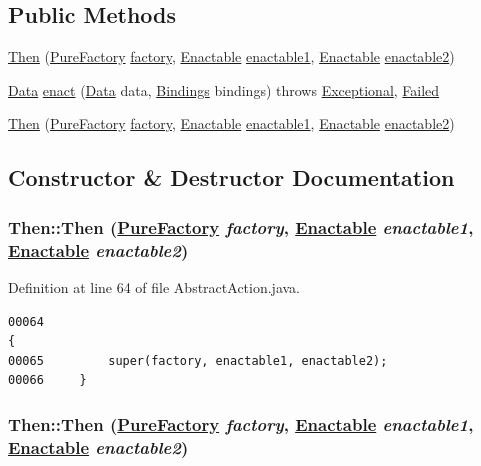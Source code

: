 \subsection*{Public Methods}
\begin{CompactItemize}
\item 
\hyperlink{classThen_a0}{Then} (\hyperlink{classPureFactory}{Pure\-Factory} \hyperlink{classDataImpl_o0}{factory}, \hyperlink{interfaceEnactable}{Enactable} \hyperlink{classAbstractInfixCombinator_o0}{enactable1}, \hyperlink{interfaceEnactable}{Enactable} \hyperlink{classAbstractInfixCombinator_o1}{enactable2})
\item 
\hyperlink{interfaceData}{Data} \hyperlink{classThen_a1}{enact} (\hyperlink{interfaceData}{Data} data, \hyperlink{interfaceBindings}{Bindings} bindings) throws \hyperlink{classExceptional}{Exceptional}, \hyperlink{classFailed}{Failed}
\item 
\hyperlink{classThen_a2}{Then} (\hyperlink{classPureFactory}{Pure\-Factory} \hyperlink{classDataImpl_o0}{factory}, \hyperlink{interfaceEnactable}{Enactable} \hyperlink{classAbstractInfixCombinator_o0}{enactable1}, \hyperlink{interfaceEnactable}{Enactable} \hyperlink{classAbstractInfixCombinator_o1}{enactable2})
\end{CompactItemize}


\subsection{Constructor \& Destructor Documentation}
\hypertarget{classThen_a0}{
\subsubsection[Then]{\setlength{\rightskip}{0pt plus 5cm}Then::Then (\hyperlink{classPureFactory}{Pure\-Factory} {\em factory}, \hyperlink{interfaceEnactable}{Enactable} {\em enactable1}, \hyperlink{interfaceEnactable}{Enactable} {\em enactable2})}}
\label{classThen_a0}




Definition at line 64 of file Abstract\-Action.java.\footnotesize\begin{verbatim}00064                                                                                  {
00065         super(factory, enactable1, enactable2);
00066     }
\end{verbatim}\normalsize 
\hypertarget{classThen_a2}{
\subsubsection[Then]{\setlength{\rightskip}{0pt plus 5cm}Then::Then (\hyperlink{classPureFactory}{Pure\-Factory} {\em factory}, \hyperlink{interfaceEnactable}{Enactable} {\em enactable1}, \hyperlink{interfaceEnactable}{Enactable} {\em enactable2})}}
\label{classThen_a2}




